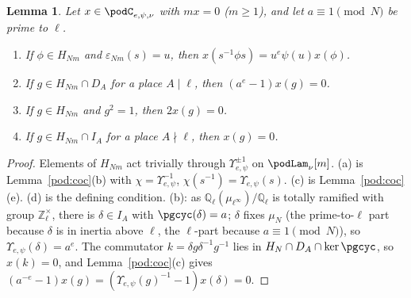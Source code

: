 \documentclass[10pt]{amsart}
\newtheorem{lemma}[theorem]{Lemma}
\theoremstyle{definition}
\theoremstyle{remark}
\newcommand{\Z}{\mathbb Z}
\newcommand{\Q}{\mathbb Q}
\begin{document}
\begin{lemma}\label{pod:locals}
Let $x\in\podC_{e,\psi,\nu}$ with $mx=0$ \textup($m\ge1$\textup), and let $a\equiv1\pmod N$ be
prime to $\ell$.
\begin{enumerate}
\item[(a)] If $\phi\in H_{Nm}$ and $\varepsilon_{Nm}(s)=u$, then $x(s^{-1}\phi s)=u^e\psi(u)x(\phi)$.
\item[(b)] If $g\in H_{Nm}\cap D_A$ for a place $A\mid\ell$, then $(a^e-1)x(g)=0$.
\item[(c)] If $g\in H_{Nm}$ and $g^2=1$, then $2x(g)=0$.
\item[(d)] If $g\in H_{Nm}\cap I_A$ for a place $A\nmid\ell$, then $x(g)=0$.
\end{enumerate}
\end{lemma}
\begin{proof}
Elements of $H_{Nm}$ act trivially through $\Upsilon_{e,\psi}^{\pm1}$ on $\podLam_\nu[m]$.
(a) is Lemma~\ref{pod:coc}(b) with $\chi=\Upsilon^{-1}_{e,\psi}$, $\chi(s^{-1})=\Upsilon_{e,\psi}(s)$.
(c) is Lemma~\ref{pod:coc}(e). (d) is the defining condition. (b): as $\Q_\ell(\mu_{\ell^\infty})/\Q_\ell$
is totally ramified with group $\Z_\ell^\times$, there is $\delta\in I_A$ with $\pgcyc(\delta)=a$;
$\delta$ fixes $\mu_N$ (the prime-to-$\ell$ part because $\delta$ is in inertia above $\ell$, the
$\ell$-part because $a\equiv1\pmod N$), so $\Upsilon_{e,\psi}(\delta)=a^e$. The commutator
$k=\delta g\delta^{-1}g^{-1}$ lies in $H_N\cap D_A\cap\ker\pgcyc$, so $x(k)=0$, and
Lemma~\ref{pod:coc}(c) gives $(a^{-e}-1)x(g)=(\Upsilon_{e,\psi}(g)^{-1}-1)x(\delta)=0$.
\end{proof}
\end{document}
